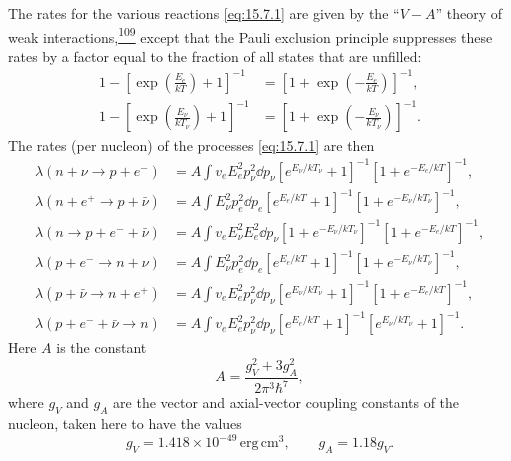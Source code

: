 The rates for the various reactions \eqref{eq:15.7.1} are given by the
``\(V-A\)'' theory of weak
interactions,\hyperref[ch15-ref-109]{\textsuperscript{109}} except that the
Pauli exclusion principle suppresses these rates by a factor equal to the
fraction of all states that are unfilled:
\[
  \begin{aligned}
    1-
    \left[
      \exp\left(\frac{E_e}{kT}\right)+1
    \right]^{-1}
    &=
    \left[
      1+\exp\left(-\frac{E_e}{kT}\right)
    \right]^{-1},
    \\
    1-
    \left[
      \exp\left(\frac{E_\nu}{kT_\nu}\right)+1
    \right]^{-1}
    &=
    \left[
      1+\exp\left(-\frac{E_\nu}{kT_\nu}\right)
    \right]^{-1}.
  \end{aligned}
\]
The rates (per nucleon) of the processes \eqref{eq:15.7.1} are then
\begin{align}
  \lambda(n+\nu\to p+e^-)
  &=
  A\int
  v_eE_e^2p_\nu^2\dd p_\nu
  [e^{E_\nu/kT_\nu}+1]^{-1}
  [1+e^{-E_e/kT}]^{-1},
  \tag{15.7.2}\label{eq:15.7.2}\\
  \lambda(n+e^+\to p+\bar\nu)
  &=
  A\int
  E_\nu^2p_e^2\dd p_e
  [e^{E_e/kT}+1]^{-1}
  [1+e^{-E_\nu/kT_\nu}]^{-1},
  \tag{15.7.3}\label{eq:15.7.3}\\
  \lambda(n\to p+e^-+\bar\nu)
  &=
  A\int
  v_eE_\nu^2E_e^2\dd p_\nu
  [1+e^{-E_\nu/kT_\nu}]^{-1}
  [1+e^{-E_e/kT}]^{-1},
  \tag{15.7.4}\label{eq:15.7.4}\\
  \lambda(p+e^-\to n+\nu)
  &=
  A\int
  E_\nu^2p_e^2\dd p_e
  [e^{E_e/kT}+1]^{-1}
  [1+e^{-E_\nu/kT_\nu}]^{-1},
  \tag{15.7.5}\label{eq:15.7.5}\\
  \lambda(p+\bar\nu\to n+e^+)
  &=
  A\int
  v_eE_e^2p_\nu^2\dd p_\nu
  [e^{E_\nu/kT_\nu}+1]^{-1}
  [1+e^{-E_e/kT}]^{-1},
  \tag{15.7.6}\label{eq:15.7.6}\\
  \lambda(p+e^-+\bar\nu\to n)
  &=
  A\int
  v_eE_e^2p_\nu^2\dd p_\nu
  [e^{E_e/kT}+1]^{-1}
  [e^{E_\nu/kT_\nu}+1]^{-1}.
  \tag{15.7.7}\label{eq:15.7.7}
\end{align}
Here \(A\) is the constant
\begin{equation}
  A=\frac{g_V^2+3g_A^2}{2\pi^3\hbar^7},
  \tag{15.7.8}\label{eq:15.7.8}
\end{equation}
where \(g_V\) and \(g_A\) are the vector and axial-vector coupling constants
of the nucleon, taken here to have the values
\begin{equation}
  g_V=1.418\times10^{-49}\,\mathrm{erg\,cm^3},
  \qquad
  g_A=1.18g_V.
  \tag{15.7.9}\label{eq:15.7.9}
\end{equation}

